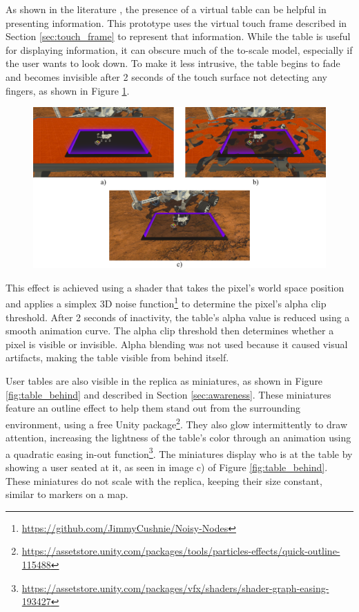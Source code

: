         As shown in the literature \cite{zielaskoMenusDeskSystem2019, sousaVRRRRoomVirtualReality2017, zielaskoNonStationaryOfficeDesk2019}, the presence of a virtual table can be helpful in presenting information. This prototype uses the virtual touch frame described in Section \ref{sec:touch_frame} to represent that information. While the table is useful for displaying information, it can obscure much of the to-scale model, especially if the user wants to look down. To make it less intrusive, the table begins to fade and becomes invisible after 2 seconds of the touch surface not detecting any fingers, as shown in Figure \ref{fig:table_visibility}.

        \begin{figure}[h!]
            \centering
            \includegraphics[width=1\textwidth]{figures/table_visibility.png}
            \label{fig:table_visibility}
        \end{figure}

        This effect is achieved using a shader that takes the pixel's world space position and applies a simplex 3D noise function\footnote{\url{https://github.com/JimmyCushnie/Noisy-Nodes}} to determine the pixel's alpha clip threshold. After 2 seconds of inactivity, the table's alpha value is reduced using a smooth animation curve. The alpha clip threshold then determines whether a pixel is visible or invisible. Alpha blending was not used because it caused visual artifacts, making the table visible from behind itself.

        User tables are also visible in the replica as miniatures, as shown in Figure \ref{fig:table_behind} and described in Section \ref{sec:awareness}. These miniatures feature an outline effect to help them stand out from the surrounding environment, using a free Unity package\footnote{\url{https://assetstore.unity.com/packages/tools/particles-effects/quick-outline-115488}}. They also glow intermittently to draw attention, increasing the lightness of the table's color through an animation using a quadratic easing in-out function\footnote{\url{https://assetstore.unity.com/packages/vfx/shaders/shader-graph-easing-193427}}. The miniatures display who is at the table by showing a user seated at it, as seen in image c) of Figure \ref{fig:table_behind}. These miniatures do not scale with the replica, keeping their size constant, similar to markers on a map.

